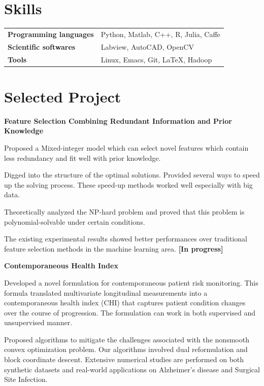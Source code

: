 \documentclass[margin,line,11pt]{resume}
\begin{document}
\begin{resume}
 \section{\mysidestyle Skills}
\vspace{0.5em}
	\begin{tabular}{ll }
\textbf{Programming languages} &Python, Matlab, C++, R, Julia, Caffe\\
\textbf{Scientific softwares}& Labview,  AutoCAD, OpenCV\\
	\textbf{Tools}& Linux, Emacs, Git, \LaTeX, Hadoop
        \end{tabular}

\clearpage        

\section{\mysidestyle Selected Project}

        \textbf{Feature Selection Combining Redundant Information and Prior Knowledge}
\begin{list2}        
\item Proposed a Mixed-integer model which can select novel features which contain less redundancy and fit well with prior knowledge.
\item Digged into the structure of the optimal solutions. Provided several ways to speed up the solving process.  These speed-up methods worked well especially with big data.
\item Theoretically analyzed the NP-hard problem and proved  that this problem is polynomial-solvable under certain conditions. 
\item The existing experimental results showed better performances over traditional feature selection methods in the machine learning area. \textbf{[In progress]}
\end{list2}

\textbf{Contemporaneous Health Index}
\begin{list2}        
\item Developed a novel formulation for contemporaneous patient risk monitoring. This formula translated multivariate longitudinal measurements into a contemporaneous health index (CHI) that captures patient condition changes over the course of progression. The formulation can work in both supervised and unsupervised manner. 
\item Proposed  algorithms to mitigate the challenges associated with the nonsmooth convex optimization problem. Our algorithms involved dual reformulation and block coordinate descent. Extensive numerical studies are performed on both synthetic datasets and real-world applications on Alzheimer's disease and Surgical Site Infection.
\end{list2}


\end{resume}
\end{document}
